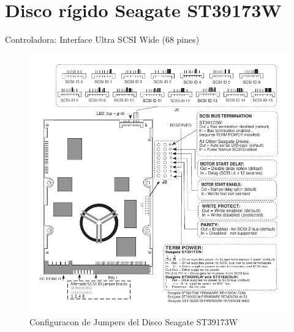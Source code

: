 \documentclass[a4paper]{article}
\begin{document}
%
\sffamily
%
\maketitle
%
% 
\section{Disco rígido Seagate ST39173W}
Controladora: Interface Ultra SCSI Wide (68 pines)
\begin{figure}[H] \begin{center}
\includegraphics[scale=1]{imgs/st39173w_pines} 
\caption{Configuracon de Jumpers del Disco Seagate ST39173W}
\end{center}
\end{figure}

%
\end{document}
